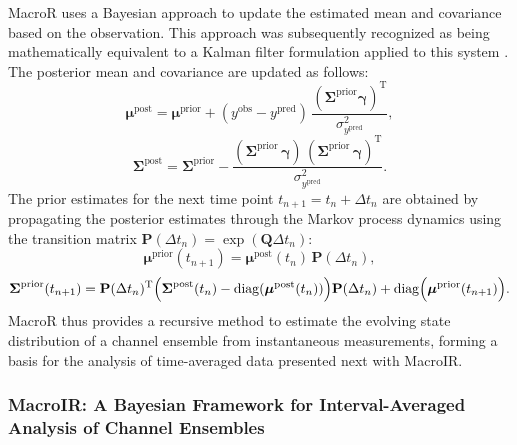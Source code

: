 \documentclass[pdflatex,sn-nature]{sn-jnl}%
\begin{document}
MacroR uses a Bayesian approach to update the estimated mean and covariance based on the observation. This approach was subsequently recognized as being mathematically equivalent to a Kalman filter formulation applied to this system \cite{stepanyuk2011efficient}. The posterior mean and covariance are updated as follows:
\begin{equation}
	\boldsymbol{\mu}^{\text{post}} = \boldsymbol{\mu}^{\text{prior}} + (y^{\text{obs}} - y^{\text{pred}})\, \frac{(\boldsymbol{\Sigma}^{\text{prior}} \boldsymbol{\gamma})^{\mathrm{T}}}{\sigma^2_{y^{\text{pred}}}},
	\label{eq:macro_mean_posterior} %
\end{equation}
\begin{equation}
	\boldsymbol{\Sigma}^{\text{post}} = \boldsymbol{\Sigma}^{\text{prior}} - \frac{(\boldsymbol{\Sigma}^{\text{prior}}\, \boldsymbol{\gamma})\, (\boldsymbol{\Sigma}^{\text{prior}}\, \boldsymbol{\gamma})^{\mathrm{T}}}{\sigma^2_{y^{\text{pred}}}}.
	\label{eq:macro_cov_posterior} %
\end{equation}
The prior estimates for the next time point \( t_{n+1} = t_n + \Delta t_n \) are obtained by propagating the posterior estimates through the Markov process dynamics using the transition matrix \( \mathbf{P}(\Delta t_n) = \exp(\boldsymbol{Q}\Delta t_n) \):
\begin{equation}
	\boldsymbol{\mu}^{\text{prior}}(t_{n+1}) = \boldsymbol{\mu}^{\text{post}}(t_n)\, \mathbf{P}(\Delta t_n),
	\label{eq:macro_mean_next_prior}
\end{equation}
\begin{equation}
	\boldsymbol{\Sigma}^{\text{prior}}(t_{n+1}) = \mathbf{P}(\Delta t_n)^{\mathrm{T}} \Bigl( \boldsymbol{\Sigma}^{\text{post}}(t_n) - \mathrm{diag}(\boldsymbol{\mu}^{\text{post}}(t_n)) \Bigr) \mathbf{P}(\Delta t_n) + \mathrm{diag}\Bigl(\boldsymbol{\mu}^{\text{prior}}(t_{n+1})\Bigr).
	\label{eq:macro_mean_next_cov} %
\end{equation}
MacroR thus provides a recursive method to estimate the evolving state distribution of a channel ensemble from instantaneous measurements, forming a basis for the analysis of time-averaged data presented next with MacroIR.

\subsubsection{MacroIR: A Bayesian Framework for Interval-Averaged Analysis of Channel Ensembles}
\end{document}
